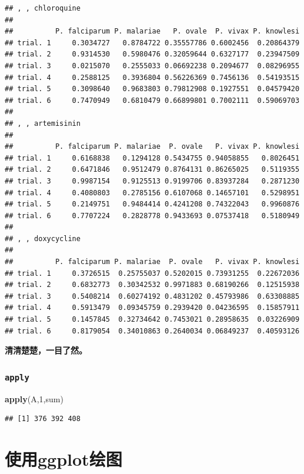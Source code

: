 \documentclass[]{book}
\newenvironment{Shaded}{\begin{snugshade}}{\end{snugshade}}
\newcommand{\DecValTok}[1]{\textcolor[rgb]{0.00,0.00,0.81}{#1}}
\newcommand{\KeywordTok}[1]{\textcolor[rgb]{0.13,0.29,0.53}{\textbf{#1}}}
\newcommand{\NormalTok}[1]{#1}
\begin{document}
\begin{verbatim}
## , , chloroquine
## 
##          P. falciparum P. malariae   P. ovale  P. vivax P. knowlesi
## trial. 1     0.3034727   0.8784722 0.35557786 0.6002456  0.20864379
## trial. 2     0.9314530   0.5980476 0.32059644 0.6327177  0.23947509
## trial. 3     0.0215070   0.2555033 0.06692238 0.2094677  0.08296955
## trial. 4     0.2588125   0.3936804 0.56226369 0.7456136  0.54193515
## trial. 5     0.3098640   0.9683803 0.79812908 0.1927551  0.04579420
## trial. 6     0.7470949   0.6810479 0.66899801 0.7002111  0.59069703
## 
## , , artemisinin
## 
##          P. falciparum P. malariae  P. ovale   P. vivax P. knowlesi
## trial. 1     0.6168838   0.1294128 0.5434755 0.94058855   0.8026451
## trial. 2     0.6471846   0.9512479 0.8764131 0.86265025   0.5119355
## trial. 3     0.9987154   0.9125513 0.9199706 0.83937284   0.2871230
## trial. 4     0.4080803   0.2785156 0.6107068 0.14657101   0.5298951
## trial. 5     0.2149751   0.9484414 0.4241208 0.74322043   0.9960876
## trial. 6     0.7707224   0.2828778 0.9433693 0.07537418   0.5180949
## 
## , , doxycycline
## 
##          P. falciparum P. malariae  P. ovale   P. vivax P. knowlesi
## trial. 1     0.3726515  0.25755037 0.5202015 0.73931255  0.22672036
## trial. 2     0.6832773  0.30342532 0.9971883 0.68190266  0.12515938
## trial. 3     0.5408214  0.60274192 0.4831202 0.45793986  0.63308885
## trial. 4     0.5913479  0.09345759 0.2939420 0.04236595  0.15857911
## trial. 5     0.1457845  0.32734642 0.7453021 0.28958635  0.03226909
## trial. 6     0.8179054  0.34010863 0.2640034 0.06849237  0.40593126
\end{verbatim}

\textbf{清清楚楚，一目了然。}

\hypertarget{apply}{%
\subsection{\texorpdfstring{\texttt{apply}}{apply}}\label{apply}}

\begin{Shaded}
\begin{Highlighting}[]
\KeywordTok{apply}\NormalTok{(A,}\DecValTok{1}\NormalTok{,sum)}
\end{Highlighting}
\end{Shaded}

\begin{verbatim}
## [1] 376 392 408
\end{verbatim}

\hypertarget{graphics}{%
\chapter{使用ggplot绘图}\label{graphics}}
\end{document}
